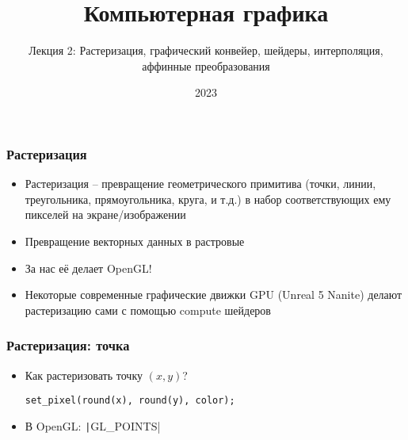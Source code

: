 \documentclass[10pt]{beamer}
\title{Компьютерная графика}
\subtitle{Лекция 2: Растеризация, графический конвейер, шейдеры, интерполяция, аффинные преобразования}
\date{2023}
\begin{document}
\frame{\titlepage}


\begin{frame}
\frametitle{Растеризация}
\begin{itemize}
\item Растеризация -- превращение геометрического примитива (точки, линии, треугольника, прямоугольника, круга, и т.д.) в набор соответствующих ему пикселей на экране/изображении
\pause
\item Превращение векторных данных в растровые
\pause
\item За нас её делает OpenGL!
\pause
\item Некоторые современные графические движки GPU (Unreal 5 Nanite) делают растеризацию сами с помощью compute шейдеров
\end{itemize}
\end{frame}

\begin{frame}[fragile]
\frametitle{Растеризация: точка}
\begin{itemize}
\item Как растеризовать точку \begin{math}(x, y)\end{math}?
\pause
{}
\begin{verbatim}
set_pixel(round(x), round(y), color);
\end{verbatim}
\pause
{}
\item В OpenGL: \texttt|GL_POINTS|
\end{itemize}
\end{frame}
\end{document}
